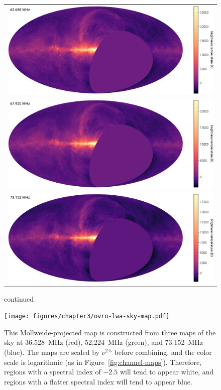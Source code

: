 \begin{bibunit}
\addtocounter{figure}{-1}
\begin{figure}[p]
    \centering
    \begin{tabular}{c}
        \includegraphics[height=0.32\textheight]{figures/chapter3/spw14} \\
        \includegraphics[height=0.32\textheight]{figures/chapter3/spw16} \\
        \includegraphics[height=0.32\textheight]{figures/chapter3/spw18} \\
    \end{tabular}
    \caption{
        continued
    }
\end{figure}

\begin{figure}[t]
    \centering
    \texttt{[image: figures/chapter3/ovro-lwa-sky-map.pdf]}
    \caption{
        This Mollweide-projected map is constructed from three maps of the sky at 36.528~MHz (red),
        52.224~MHz (green), and 73.152~MHz (blue). The maps are scaled by $\nu^{2.5}$ before
        combining, and the color scale is logarithmic (as in Figure~\ref{fig:channel-maps}).
        Therefore, regions with a spectral index of $-2.5$ will tend to appear white, and regions
        with a flatter spectral index will tend to appear blue.
    }
    \label{fig:three-color}
\end{figure}


\end{bibunit}
